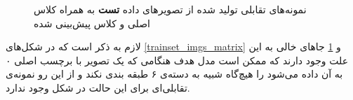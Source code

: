 \begin{figure}[H]
	\caption{نمونه‌های تقابلی تولید شده از تصویر‌های داده
		 \textbf{تست} 
		به همراه کلاس اصلی و کلاس پیش‌بینی شده}
	\label{testset_imgs_matrix}
\end{figure}
لازم به ذکر است که در شکل‌های
\ref{trainset_imgs_matrix} 
و 
\ref{testset_imgs_matrix} 
جاهای خالی به این علت وجود دارند که ممکن است مدل هدف هنگامی که یک تصویر با برچسب اصلی ۰ به آن داده می‌شود را هیچ‌گاه شبیه به دسته‌ی ۶ طبقه بندی نکند و از این رو نمونه‌ی تقابلی‌ای برای این حالت در شکل وجود ندارد.

